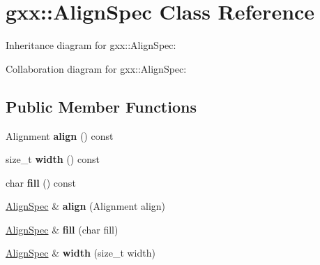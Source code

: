 \hypertarget{classgxx_1_1AlignSpec}{}\section{gxx\+:\+:Align\+Spec Class Reference}
\label{classgxx_1_1AlignSpec}


Inheritance diagram for gxx\+:\+:Align\+Spec\+:


Collaboration diagram for gxx\+:\+:Align\+Spec\+:
\subsection*{Public Member Functions}
\begin{DoxyCompactItemize}
\item 
Alignment {\bfseries align} () const \hypertarget{classgxx_1_1AlignSpec_a654c771a049d0e13db0b7f76ab4d1b3e}{}\label{classgxx_1_1AlignSpec_a654c771a049d0e13db0b7f76ab4d1b3e}

\item 
size\+\_\+t {\bfseries width} () const \hypertarget{classgxx_1_1AlignSpec_a04e46885c43f5723db9f5ea60167e2ed}{}\label{classgxx_1_1AlignSpec_a04e46885c43f5723db9f5ea60167e2ed}

\item 
char {\bfseries fill} () const \hypertarget{classgxx_1_1AlignSpec_a99f16ecd665cca2e55c81cf35e1ea25d}{}\label{classgxx_1_1AlignSpec_a99f16ecd665cca2e55c81cf35e1ea25d}

\item 
\hyperlink{classgxx_1_1AlignSpec}{Align\+Spec} \& {\bfseries align} (Alignment align)\hypertarget{classgxx_1_1AlignSpec_a1120c1314faf5dd458313fe5961b7c92}{}\label{classgxx_1_1AlignSpec_a1120c1314faf5dd458313fe5961b7c92}

\item 
\hyperlink{classgxx_1_1AlignSpec}{Align\+Spec} \& {\bfseries fill} (char fill)\hypertarget{classgxx_1_1AlignSpec_ad06cfdf3df3fb1a0cbcdfccd028f0b3d}{}\label{classgxx_1_1AlignSpec_ad06cfdf3df3fb1a0cbcdfccd028f0b3d}

\item 
\hyperlink{classgxx_1_1AlignSpec}{Align\+Spec} \& {\bfseries width} (size\+\_\+t width)\hypertarget{classgxx_1_1AlignSpec_a2092d47a38e4c52e5964a732e1ddfb52}{}\label{classgxx_1_1AlignSpec_a2092d47a38e4c52e5964a732e1ddfb52}

\end{DoxyCompactItemize}
